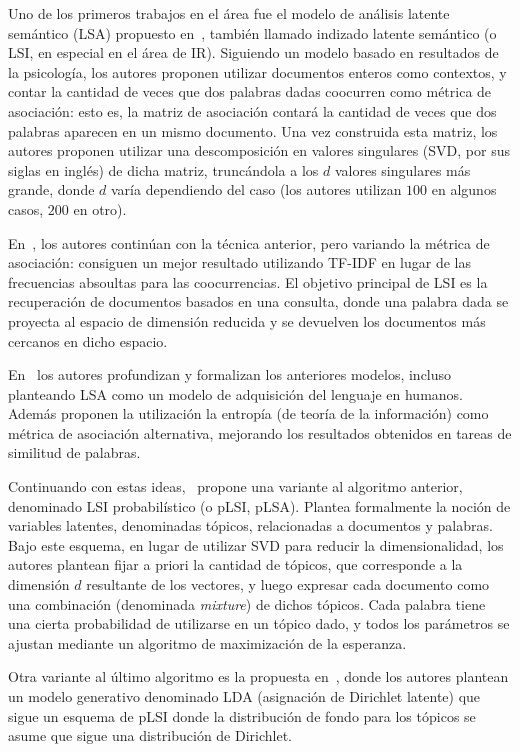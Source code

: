 Uno de los primeros trabajos en el área fue el modelo de análisis latente semántico (LSA) propuesto
en~\cite{Dumais1988}, también llamado indizado latente semántico (o LSI, en especial en el área de
IR). Siguiendo un modelo basado en resultados de la psicología, los autores proponen utilizar
documentos enteros como contextos, y contar la cantidad de veces que dos palabras dadas coocurren
como métrica de asociación: esto es, la matriz de asociación contará la cantidad de veces que dos
palabras aparecen en un mismo documento. Una vez construida esta matriz, los autores proponen
utilizar una descomposición en valores singulares (SVD, por sus siglas en inglés) de dicha matriz,
truncándola a los $d$ valores singulares más grande, donde $d$ varía dependiendo del caso (los
autores utilizan $100$ en algunos casos, $200$ en otro).

En~\cite{Deerwester1990}, los autores continúan con la técnica anterior, pero variando la métrica de
asociación: consiguen un mejor resultado utilizando TF-IDF en lugar de las frecuencias absoultas
para las coocurrencias. El objetivo principal de LSI es la recuperación de documentos basados en una
consulta, donde una palabra dada se proyecta al espacio de dimensión reducida y se devuelven los
documentos más cercanos en dicho espacio.

En~\cite{LandauerDumais1997} los autores profundizan y formalizan los anteriores modelos, incluso
planteando LSA como un modelo de adquisición del lenguaje en humanos. Además proponen la utilización
la entropía (de teoría de la información) como métrica de asociación alternativa, mejorando los
resultados obtenidos en tareas de similitud de palabras.

Continuando con estas ideas,~\cite{Hoffman1999} propone una variante al algoritmo anterior,
denominado LSI probabilístico (o pLSI, pLSA). Plantea formalmente la noción de variables latentes,
denominadas tópicos, relacionadas a documentos y palabras. Bajo este esquema, en lugar de utilizar
SVD para reducir la dimensionalidad, los autores plantean fijar a priori la cantidad de tópicos, que
corresponde a la dimensión $d$ resultante de los vectores, y luego expresar cada documento como una
combinación (denominada \textit{mixture}) de dichos tópicos. Cada palabra tiene una cierta
probabilidad de utilizarse en un tópico dado, y todos los parámetros se ajustan mediante un
algoritmo de maximización de la esperanza.

Otra variante al último algoritmo es la propuesta en~\cite{Blei2003}, donde los autores plantean un
modelo generativo denominado LDA (asignación de Dirichlet latente) que sigue un esquema de pLSI
donde la distribución de fondo para los tópicos se asume que sigue una distribución de Dirichlet.


